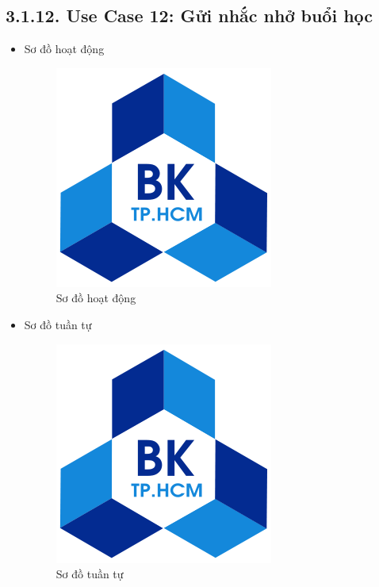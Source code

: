 \subsection*{3.1.12. Use Case 12: Gửi nhắc nhở buổi học}
\begin{itemize}
    \item Sơ đồ hoạt động
    \begin{figure}[H]
    \centering
    \includegraphics[scale=0.5 ]{Picture/hcmut.png}
    \caption{Sơ đồ hoạt động }
    \end{figure}
    \item Sơ đồ tuần tự
    \begin{figure}[H]
    \centering
    \includegraphics[scale=0.5 ]{Picture/hcmut.png}
    \caption{Sơ đồ tuần tự }
    \end{figure}
\end{itemize}

